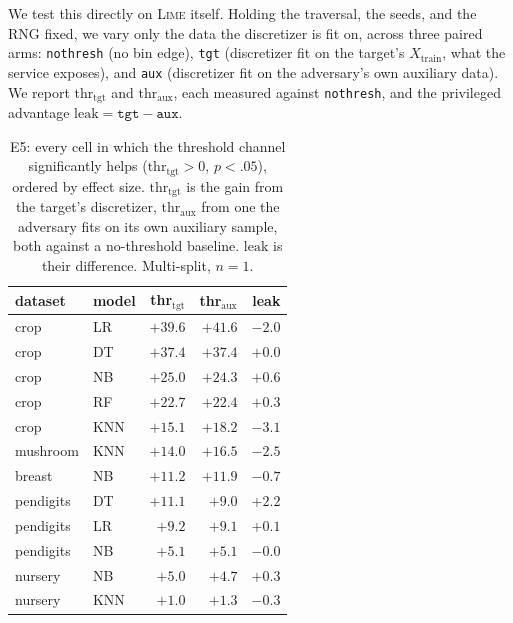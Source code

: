 \documentclass[sigconf,anonymous,review]{acmart}
\begin{document}
We test this directly on \textsc{Lime} itself. Holding the traversal, the seeds, and the RNG fixed, we
vary only the data the discretizer is fit on, across three paired arms: \texttt{nothresh} (no bin
edge), \texttt{tgt} (discretizer fit on the target's $X_{\text{train}}$, what the service exposes),
and \texttt{aux} (discretizer fit on the adversary's own auxiliary data). We report
$\text{thr}_{\text{tgt}}$ and $\text{thr}_{\text{aux}}$, each measured against \texttt{nothresh}, and
the privileged advantage $\text{leak}=\texttt{tgt}-\texttt{aux}$.

\begin{table}[t]
\centering
\caption{E5: every cell in which the threshold channel significantly helps ($\text{thr}_{\text{tgt}}>0$,
$p{<}.05$), ordered by effect size. $\text{thr}_{\text{tgt}}$ is the gain from the target's
discretizer, $\text{thr}_{\text{aux}}$ from one the adversary fits on its own auxiliary sample, both
against a no-threshold baseline. $\text{leak}$ is their difference. Multi-split, $n{=}1$.}
\label{tab:auxdisc}
\begin{tabular}{llrrr}
\toprule
dataset & model & thr$_{\text{tgt}}$ & thr$_{\text{aux}}$ & leak \\
\midrule
crop      & LR  & $+39.6$ & $+41.6$ & $-2.0$ \\
crop      & DT  & $+37.4$ & $+37.4$ & $+0.0$ \\
crop      & NB  & $+25.0$ & $+24.3$ & $+0.6$ \\
crop      & RF  & $+22.7$ & $+22.4$ & $+0.3$ \\
crop      & KNN & $+15.1$ & $+18.2$ & $-3.1$ \\
mushroom  & KNN & $+14.0$ & $+16.5$ & $-2.5$ \\
breast    & NB  & $+11.2$ & $+11.9$ & $-0.7$ \\
pendigits & DT  & $+11.1$ & $+9.0$  & $+2.2$ \\
pendigits & LR  & $+9.2$  & $+9.1$  & $+0.1$ \\
pendigits & NB  & $+5.1$  & $+5.1$  & $-0.0$ \\
nursery   & NB  & $+5.0$  & $+4.7$  & $+0.3$ \\
nursery   & KNN & $+1.0$  & $+1.3$  & $-0.3$ \\
\bottomrule
\end{tabular}
\end{table}
\end{document}
